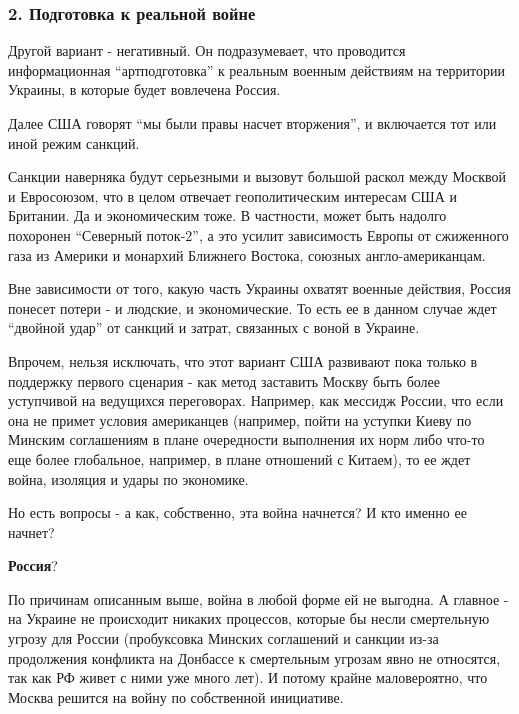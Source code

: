  
 
 
 
 

\subsubsection{2. Подготовка к реальной войне}

Другой вариант - негативный. Он подразумевает, что проводится информационная
\enquote{артподготовка} к реальным военным действиям на территории Украины, в которые
будет вовлечена Россия. 

Далее США говорят \enquote{мы были правы насчет вторжения}, и включается тот или иной
режим санкций.

Санкции наверняка будут серьезными и вызовут большой раскол между Москвой и
Евросоюзом, что в целом отвечает геополитическим интересам США и Британии. Да и
экономическим тоже. В частности, может быть надолго похоронен \enquote{Северный
поток-2}, а это усилит зависимость Европы от сжиженного газа из Америки и
монархий Ближнего Востока, союзных англо-американцам. 

Вне зависимости от того, какую часть Украины охватят военные действия, Россия
понесет потери - и людские, и экономические. То есть ее в данном случае ждет
\enquote{двойной удар} от санкций и затрат, связанных с воной в Украине. 

Впрочем, нельзя исключать, что этот вариант США развивают пока только в
поддержку первого сценария - как метод заставить Москву быть более уступчивой
на ведущихся переговорах. Например, как мессидж России, что если она не примет
условия американцев (например, пойти на уступки Киеву по Минским соглашениям в
плане очередности выполнения их норм либо что-то еще более глобальное,
например, в плане отношений с Китаем), то ее ждет война, изоляция и удары по
экономике.

Но есть вопросы - а как, собственно, эта война начнется? И кто именно ее
начнет?

\textbf{Россия}? 

По причинам описанным выше, война в любой форме ей не выгодна. А главное - на
Украине не происходит никаких процессов, которые бы несли смертельную угрозу
для России (пробуксовка Минских соглашений и санкции из-за продолжения
конфликта на Донбассе к смертельным угрозам явно не относятся, так как РФ живет
с ними уже много лет). И потому крайне маловероятно, что Москва решится на
войну по собственной инициативе.

